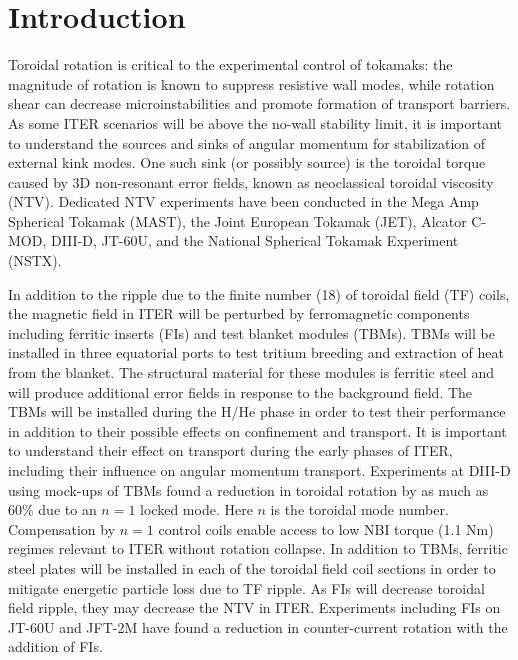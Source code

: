 \documentclass[aip, pop, preprint]{revtex4-1}
\numberwithin{figure}{section}
\numberwithin{equation}{section}
\begin{document}
\maketitle

\section{Introduction}

Toroidal rotation is critical to the experimental control of tokamaks: the magnitude of rotation is known to suppress resistive wall modes,\cite{Bondeson1994, Garofalo2002} while rotation shear can decrease microinstabilities and promote formation of transport barriers.\cite{Burrell1997, Terry2000} As some ITER scenarios will be above the no-wall stability limit,\cite{Liu2004} it is important to understand the sources and sinks of angular momentum for stabilization of external kink modes. One such sink (or possibly source) is the toroidal torque caused by 3D non-resonant error fields, known as neoclassical toroidal viscosity (NTV). Dedicated NTV experiments have been conducted in the Mega Amp Spherical Tokamak (MAST),\cite{Hua2010} the Joint European Tokamak (JET),\cite{Lazzaro2002, DeVries2008b} Alcator C-MOD,\cite{Wolfe2005}  DIII-D,\cite{Garofalo2008,Reimerdes2009} JT-60U,\cite{Honda2014} and the National Spherical Tokamak Experiment (NSTX).\cite{Zhu2006} 

In addition to the ripple due to the finite number (18) of toroidal field (TF) coils, the magnetic field in ITER will be perturbed by ferromagnetic components including ferritic inserts (FIs) and test blanket modules (TBMs). TBMs will be installed in three equatorial ports to test tritium breeding and extraction of heat from the blanket. The structural material for these modules is ferritic steel and will produce additional error fields in response to the background field. The TBMs will be installed during the H/He phase in order to test their performance in addition to their possible effects on confinement and transport.\cite{Chuyanov2010} It is important to understand their effect on transport during the early phases of ITER, including their influence on angular momentum transport. Experiments at DIII-D using mock-ups of TBMs found a reduction in toroidal rotation by as much as 60\% due to an $n = 1$ locked mode.\cite{Schaffer2011} Here $n$ is the toroidal mode number. Compensation by $n=1$ control coils enable access to low NBI torque (1.1 Nm) regimes relevant to ITER without rotation collapse.\cite{Lanctot2017} In addition to TBMs, ferritic steel plates will be installed in each of the toroidal field coil sections in order to mitigate energetic particle loss due to TF ripple.\cite{Tobita2003} As FIs will decrease toroidal field ripple, they may decrease the NTV in ITER. Experiments including FIs on JT-60U\cite{Urano2007} and JFT-2M\cite{Kawashima2001} have found a reduction in counter-current rotation with the addition of FIs.
\end{document}
